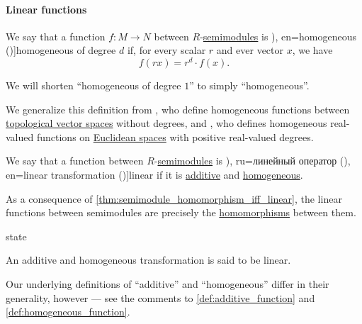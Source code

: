 \paragraph{Linear functions}

\begin{definition}\label{def:homogeneous_function}\mimprovised
  We say that a function \( f: M \to N \) between \( R \)-\hyperref[def:semimodule]{semimodules} is \term[ru=однородная (\cite[416]{Зорич2019АнализЧасть1}), en=homogeneous (\cite[def. 2.3.1]{HillePhillips1996FunctionalAnalysis})]{homogeneous} of degree \( d \) if, for every scalar \( r \) and ever vector \( x \), we have
  \begin{equation}\label{eq:def:homogeneous_function}
    f(rx) = r^d \cdot f(x).
  \end{equation}

  We will shorten \enquote{homogeneous of degree \( 1 \)} to simply \enquote{homogeneous}.
\end{definition}
\begin{comments}
  \item We generalize this definition from , who define homogeneous functions between \hyperref[def:topological_vector_space]{topological vector spaces} without degrees, and , who defines homogeneous real-valued functions on \hyperref[def:euclidean_space]{Euclidean spaces} with positive real-valued degrees.
\end{comments}

\begin{definition}\label{def:linear_function}\mimprovised
  We say that a function between \( R \)-\hyperref[def:semimodule]{semimodules} is \term[bg=линейно преобразувание (\cite[101]{Обрешков1962ВисшаАлгебра}), ru=линейный оператор (\cite[236]{Тыртышников2007ЛинейнаяАлгебра}), en=linear transformation (\cite[def. 2.3.2]{HillePhillips1996FunctionalAnalysis})]{linear} if it is \hyperref[def:additive_function]{additive} and \hyperref[def:homogeneous_function]{homogeneous}.
\end{definition}
\begin{comments}
  \item As a consequence of \cref{thm:semimodule_homomorphism_iff_linear}, the linear functions between semimodules are precisely the \hyperref[def:semimodule/homomorphism]{homomorphisms} between them.

  \item {} state
  \begin{displayquote}
    An additive and homogeneous transformation is said to be linear.
  \end{displayquote}

  Our underlying definitions of \enquote{additive} and \enquote{homogeneous} differ in their generality, however --- see the comments to \cref{def:additive_function} and \cref{def:homogeneous_function}.
\end{comments}

